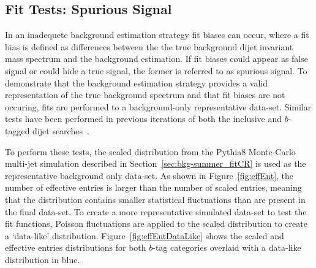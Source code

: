 \FloatBarrier
\subsection{Fit Tests: Spurious Signal}
\label{sec:bkg-summer_spusig}

In an inadequete background estimation strategy fit biases can occur,
where a fit bias is defined as differences between the the true background
dijet invariant mass spectrum and the background estimation.
If fit biases could appear as false signal or could hide a true signal, the former is referred to as spurious signal.
To demonstrate that the background estimation strategy provides a valid representation of the true background spectrum
and that fit biases are not occuring, fits are performed to a background-only representative data-set.
Similar tests have been performed in previous iterations of both the inclusive and $b$-tagged dijet searches~\cite{dijet-mori16_paper,dibjet-mori16_paper}.

To perform these tests, the scaled distribution from the {\sc Pythia}8 Monte-Carlo multi-jet simulation
described in Section~\ref{sec:bkg-summer_fitCR}
is used as the representative background only data-set.
As shown in Figure~\ref{fig:effEnt},
the number of effective entries is larger than the number of scaled entries,
meaning that the distribution contains smaller statistical fluctuations than are present in the final data-set.
To create a more representative simulated data-set to test the fit functions,
Poisson fluctuations are applied to the scaled distribution to create a `data-like' distribution.
Figure~\ref{fig:effEntDataLike} shows the scaled and effective entries distributions for both
$b$-tag categories overlaid with a data-like distribution in blue.

